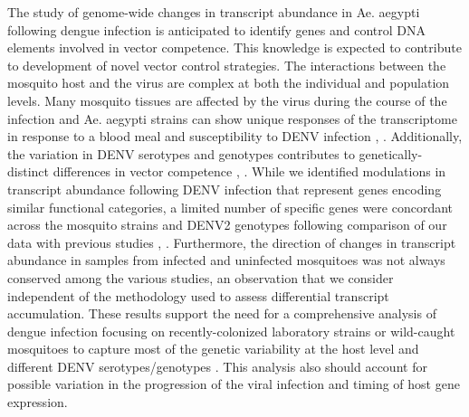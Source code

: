 The study of genome-wide changes in transcript abundance in Ae. aegypti following dengue infection is anticipated to identify genes and control DNA elements involved in vector competence.
This knowledge is expected to contribute to development of novel vector control strategies.
The interactions between the mosquito host and the virus are complex at both the individual and population levels.
Many mosquito tissues are affected by the virus during the course of the infection and Ae. aegypti strains can show unique responses of the transcriptome in response to a blood meal and susceptibility to DENV infection \cite{Black2002}, \cite{bonizzoni2012strain}.
Additionally, the variation in DENV serotypes and genotypes contributes to genetically-distinct differences in vector competence \cite{Anderson2006}, \cite{Weaver2009}.
While we identified modulations in transcript abundance following DENV infection that represent genes encoding similar functional categories, a limited number of specific genes were concordant across the mosquito strains and DENV2 genotypes following comparison of our data with previous studies \cite{Xi2008}, \cite{Luplertlop2011}\cite{Behura2011}\cite{Sim2012}\cite{Colpitts2011}.
Furthermore, the direction of changes in transcript abundance in samples from infected and uninfected mosquitoes was not always conserved among the various studies, an observation that we consider independent of the methodology used to assess differential transcript accumulation.
These results support the need for a comprehensive analysis of dengue infection focusing on recently-colonized laboratory strains or wild-caught mosquitoes to capture most of the genetic variability at the host level and different DENV serotypes/genotypes \cite{Armstrong2001}.
This analysis also should account for possible variation in the progression of the viral infection and timing of host gene expression.